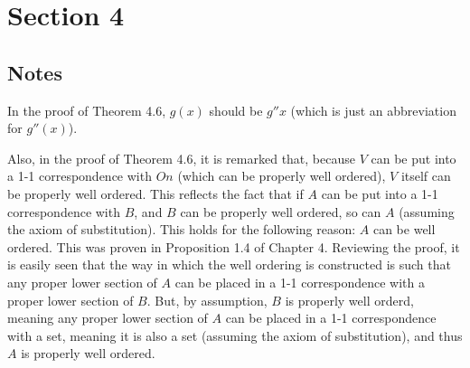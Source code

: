 \documentclass{article}
\theoremstyle{definition}
\begin{document}
\section*{Section 4}

\subsection*{Notes}
In the proof of Theorem 4.6, $g(x)$ should be $g''x$ (which is just an abbreviation for $g''(x)$).

Also, in the proof of Theorem 4.6, it is remarked that, because $V$ can be put into a 1-1 correspondence with $On$ (which 
can be properly well ordered), $V$ itself can be properly well ordered. This reflects the fact that if $A$ can be put 
into a 1-1 correspondence with $B$, and $B$ can be properly well ordered, so can $A$ (assuming the axiom of substitution). 
This holds for the following 
reason: $A$ can be well ordered. This was proven in Proposition 1.4 of Chapter 4. Reviewing the proof, it is easily seen 
that the way in which the well ordering is constructed is such that any proper lower section of $A$ can be placed in a 
1-1 correspondence with a proper lower section of $B$. 
But, by assumption, $B$ is properly well orderd, meaning any proper lower section of 
$A$ can be placed in a 1-1 correspondence with a set, meaning it is also a set (assuming the axiom of substitution), and 
thus $A$ is properly well ordered. 
\end{document}
